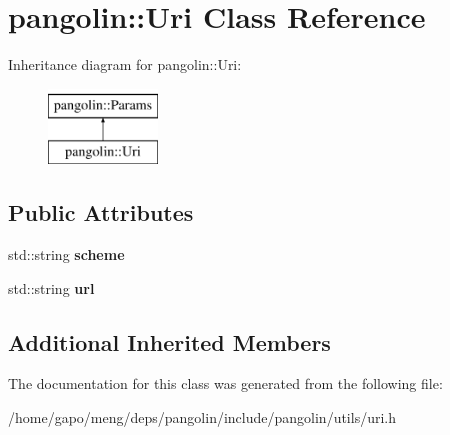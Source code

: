 \hypertarget{classpangolin_1_1_uri}{}\section{pangolin\+:\+:Uri Class Reference}
\label{classpangolin_1_1_uri}
Inheritance diagram for pangolin\+:\+:Uri\+:\begin{figure}[H]
\begin{center}
\leavevmode
\includegraphics[height=2.000000cm]{classpangolin_1_1_uri}
\end{center}
\end{figure}
\subsection*{Public Attributes}
\begin{DoxyCompactItemize}
\item 
std\+::string {\bfseries scheme}\hypertarget{classpangolin_1_1_uri_a49880799f689f61adb3788e9eef43392}{}\label{classpangolin_1_1_uri_a49880799f689f61adb3788e9eef43392}

\item 
std\+::string {\bfseries url}\hypertarget{classpangolin_1_1_uri_a984fcdc9247f61134c1a40f5662a812e}{}\label{classpangolin_1_1_uri_a984fcdc9247f61134c1a40f5662a812e}

\end{DoxyCompactItemize}
\subsection*{Additional Inherited Members}


The documentation for this class was generated from the following file\+:\begin{DoxyCompactItemize}
\item 
/home/gapo/meng/deps/pangolin/include/pangolin/utils/uri.\+h\end{DoxyCompactItemize}
